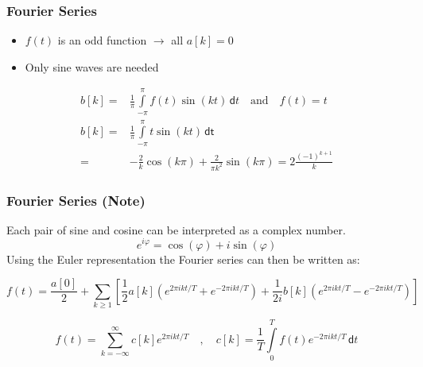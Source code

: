 \begin{frame}
    \frametitle{Fourier Series}

    \begin{itemize}
        \item $f(t)$ is an odd function $\rightarrow$ all $a[k]=0$
        \item Only sine waves are needed
    \end{itemize}

    \begin{align*}
        b[k] = & \frac{1}{\pi} \int\limits_{-\pi}^{\pi} f(t) \sin ( kt) \, \mathsf{d}t \quad \text{and} \quad f(t)=t \\
        b[k] = & \frac{1}{\pi} \int\limits_{-\pi}^{\pi} t \sin (kt) \, \mathsf{dt}                                   \\
        =      & -\frac{2}{k} \cos (k\pi) + \frac{2}{\pi k^2} \sin (k\pi) = 2 \frac{(-1)^{k+1}}{k}
    \end{align*}

\end{frame}



\begin{frame}
    \frametitle{Fourier Series (Note)}
    Each pair of sine and cosine can be interpreted as a complex number.
    \begin{equation*}
        e^{i\varphi} = \cos(\varphi) + i \sin(\varphi)
    \end{equation*}\newline
    Using the Euler representation the Fourier series can then be written as:


    \begin{equation*}
        f(t) = \dfrac {a[0]}{2} + \sum\limits_{k\ge1} \left[ \frac{1}{2} a[k] \left(e^{2\pi ikt/T} + e^{-2\pi ikt/T} \right)+ \frac{1}{2i} b[k] \left(e^{2\pi ikt/T} - e^{-2\pi ikt/T} \right) \right]
    \end{equation*}

    \begin{equation*}
        f(t) = \sum\limits_{k=-\infty}^{\infty} c[k] e^{2\pi ikt/T} \quad , \quad
        c[k] = \frac{1}{T}\int\limits_{0}^{T} f(t) e^{-2\pi ikt/T}\, \mathsf{d}t
    \end{equation*}
\end{frame}



